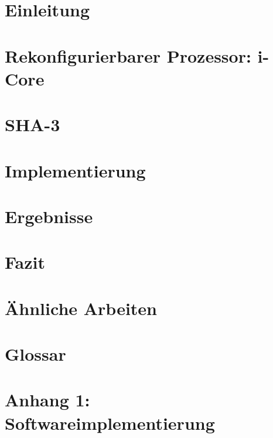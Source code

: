 \chapter{Einleitung}


\chapter{Rekonfigurierbarer Prozessor: i-Core}


\chapter{SHA-3}


\chapter{Implementierung}


\newpage

\newpage


\chapter{Ergebnisse}
\label{cha:ergebnisse}


\chapter{Fazit}


\chapter{Ähnliche Arbeiten}


\chapter{Glossar}


\chapter{Anhang 1: Softwareimplementierung}
\label{cha:anhang1}


